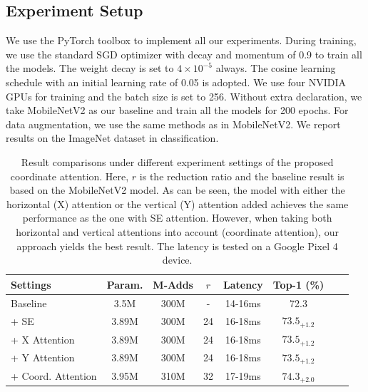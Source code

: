 \documentclass[final]{cvpr}
\begin{document}
\subsection{Experiment Setup}

We use the PyTorch toolbox \cite{paszke2019pytorch}
to implement all our experiments.
%
During training, we use the standard SGD optimizer
with decay and momentum of 0.9 to train all the models.
%
The weight decay is set to $4\times 10^{-5}$ always.
%
The cosine learning schedule with an initial learning rate of 0.05 is adopted.
%
We use four NVIDIA GPUs for training and the batch size is set to 256.
%
Without extra declaration, we take MobileNetV2 as our baseline and train all the models for 200 epochs.
%
For data augmentation, we use the same methods as
in MobileNetV2.
%
We report results on the ImageNet dataset \cite{russakovsky2015imagenet} 
in classification.


\begin{table}[t]
    \centering
    \small
    \setlength\tabcolsep{1mm}
    \renewcommand{\arraystretch}{1.1}
    \caption{Result comparisons under different experiment settings of the
    proposed coordinate attention. Here, $r$ is the reduction ratio
    and the baseline result is based on the MobileNetV2 model.
    As can be seen, the model with either the horizontal (X) attention or the vertical (Y) attention added
    achieves the same performance as the one with SE attention. However, when taking both horizontal and vertical
    attentions into account (coordinate attention), our approach yields
    the best result. The latency is tested on a Google Pixel 4 device.}
    \begin{tabular}{lccccccc} \midrule[1pt]
    Settings & Param. & M-Adds & $r$ & Latency & Top-1 (\%)  \\ \midrule[1pt]
    Baseline  &   3.5M      &  300M   & - & 14-16ms &  72.3     \\
    + SE &   3.89M      &  300M & 24  & 16-18ms & $73.5_{+1.2}$     \\
    + X Attention &   3.89M &   300M & 24 & 16-18ms & $73.5_{+1.2}$  \\
    + Y Attention &   3.89M &   300M & 24 & 16-18ms & $73.5_{+1.2}$ \\
    + Coord. Attention &   3.95M & 310M & 32 & 17-19ms & $\mathbf{74.3_{+2.0}}$ \\ \bottomrule[1pt]
    \end{tabular}
    \label{tab:comp_set}
\end{table}
\end{document}
